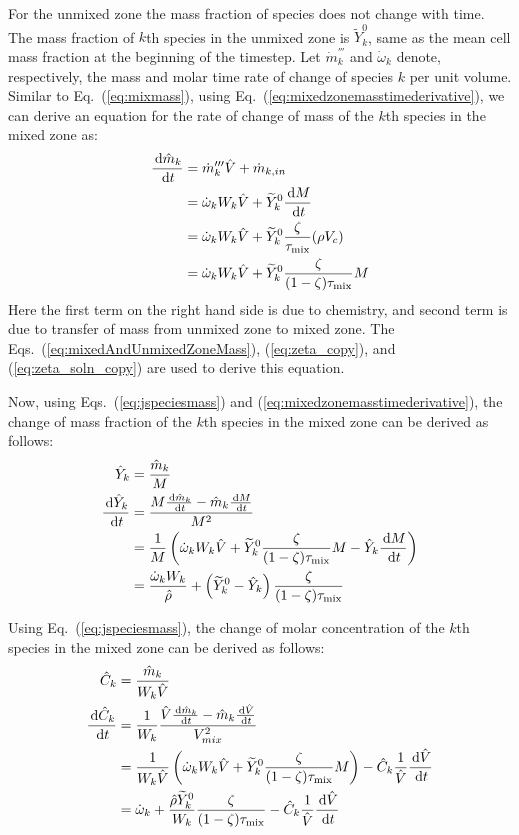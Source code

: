 For the unmixed zone the mass fraction of species does not change with time. The mass fraction of $k$th species in the unmixed zone is $\widetilde{Y}_k^0$, same as the mean cell mass fraction at the beginning of the timestep. Let $\dot{m}_{k}^{'''}$ and $\dot{\omega}_k$ denote, respectively, the mass and molar time rate of change of species $k$ per unit volume. Similar to Eq.~(\ref{eq:mixmass}), using Eq.~(\ref{eq:mixedzonemasstimederivative}), we can derive an equation for the rate of change of mass of the $k$th species in the mixed zone as:
\begin{align} \label{eq:jspeciesmass}
    \frac{\,\mathrm{d} {\hat{m}_{k}}}{\,\mathrm{d} t} &= \dot{m}'''_{k} \hat{V} + \dot{m}_{k,in} \\
    &=\dot{\omega}_k W_k \hat{V} + \widetilde{Y}_k^0 \frac{\,\mathrm{d} M}{\,\mathrm{d} t} \\
    &=\dot{\omega}_k W_k \hat{V} + \widetilde{Y}_k^0 \frac{\zeta}{\tau_{\rm mix}} (\rho V_c)   \\
    &=\dot{\omega}_k W_k \hat{V} + \widetilde{Y}_k^0 \frac{\zeta}{(1-\zeta)\tau_{\rm mix}} M
\end{align}
Here the first term on the right hand side is due to chemistry, and second term is due to transfer of mass from unmixed zone to mixed zone. The Eqs.~(\ref{eq:mixedAndUnmixedZoneMass}), (\ref{eq:zeta_copy}), and (\ref{eq:zeta_soln_copy}) are used to derive this equation.


Now, using Eqs.~(\ref{eq:jspeciesmass}) and (\ref{eq:mixedzonemasstimederivative}), the change of mass fraction of the $k$th species in the mixed zone can be derived as follows:
\begin{align} \label{eq:jspeciesmassfraction}
    \hat{Y}_{k} &= \frac{\hat{m}_{k}}{M} \\
    \frac{\,\mathrm{d} {\hat{Y}_{k}}}{\,\mathrm{d} t} &= \frac{M \frac{\,\mathrm{d} {\hat{m}_{k}}}{\,\mathrm{d} t} - \hat{m}_{k} \frac{\,\mathrm{d} M}{\,\mathrm{d} t}}{M^2} \\
    &=\frac{1}{M} \left( \dot{\omega}_k W_k \hat{V} + \widetilde{Y}_k^0 \frac{\zeta}{(1-\zeta)\tau_{\rm mix}} M - \hat{Y}_{k} \frac{\,\mathrm{d} {M}}{\,\mathrm{d} t} \right)  \\
    &= \frac{\dot{\omega}_k W_k}{\hat{\rho}} + \left( \widetilde{Y}_k^0 - \hat{Y}_{k}\right) \frac{\zeta}{(1-\zeta) \tau_{\rm mix}}
\end{align}

Using Eq.~(\ref{eq:jspeciesmass}), the change of molar concentration of the $k$th species in the mixed zone can be derived as follows:
\begin{align} \label{eq:jspeciemolarconcentration}
    \hat{C}_{k} &= \frac{\hat{m}_{k}}{W_k \hat{V}} \\
    \frac{\,\mathrm{d} {\hat{C}_{k}}}{\,\mathrm{d} t} &= \frac{1}{W_k} \frac{\hat{V} \frac{\,\mathrm{d} {\hat{m}_{k}}}{\,\mathrm{d} t} - \hat{m}_{k} \frac{\,\mathrm{d} {\hat{V}}}{\,\mathrm{d} t}}{V^2_{mix}} \\
    &=\frac{1}{W_k \hat{V}} \left( \dot{\omega}_k W_k \hat{V} + \widetilde{Y}_k^0 \frac{\zeta}{(1-\zeta)\tau_{\rm mix}} M \right) - \hat{C}_{k} \frac{1}{\hat{V}}\frac{\,\mathrm{d} {\hat{V}}}{\,\mathrm{d} t}  \\
    &= \dot{\omega}_k +  \frac{\hat{\rho} \widetilde{Y}_k^0}{W_k} \frac{\zeta}{(1-\zeta) \tau_{\rm mix}} - \hat{C}_{k} \frac{1}{\hat{V}}\frac{\,\mathrm{d} {\hat{V}}}{\,\mathrm{d} t}
\end{align}

